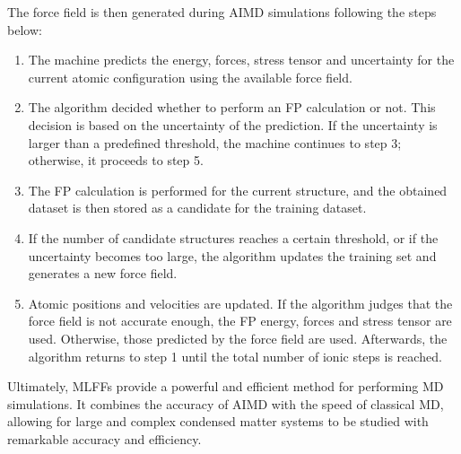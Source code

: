 The force field is then generated during AIMD simulations following 
the steps below:
\begin{enumerate}
    \item The machine predicts the energy, forces, stress tensor 
    and uncertainty for the current atomic configuration using 
    the available force field. 

    \item The algorithm decided whether to perform an FP calculation
    or not. This decision is based on the uncertainty of the prediction. 
    If the uncertainty is larger than a predefined threshold, the machine 
    continues to step 3; otherwise, it proceeds to step 5. 

    \item The FP calculation is performed for the current structure, and the 
    obtained dataset is then stored as a candidate for the training 
    dataset. 

    \item If the number of candidate structures reaches a certain threshold, or if 
    the uncertainty becomes too large, the algorithm updates the training 
    set and generates a new force field. 

    \item Atomic positions and velocities are updated. If the algorithm 
    judges that the force field is not accurate enough, the FP energy, forces 
    and stress tensor are used. Otherwise, those predicted by 
    the force field are used. Afterwards, the algorithm returns to step 
    1 until the total number of ionic steps is reached.
\end{enumerate}

Ultimately, MLFFs provide a powerful and efficient method for performing 
MD simulations. It combines the accuracy of AIMD with the speed of classical
MD, allowing for large and complex condensed matter systems 
to be studied with remarkable accuracy and efficiency.
